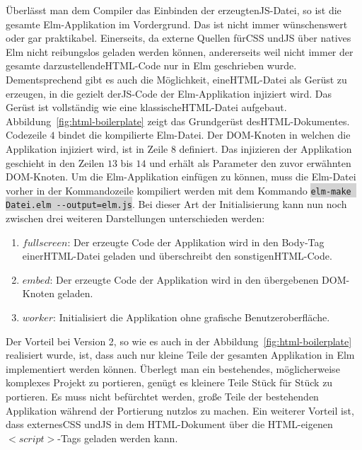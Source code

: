 Überlässt man dem Compiler das Einbinden der erzeugten\ac{JS}-Datei, so ist die gesamte Elm-Applikation im Vordergrund. Das ist nicht immer wünschenswert oder gar praktikabel. Einerseits, da externe Quellen für\ac{CSS} und\ac{JS} über natives Elm nicht reibungslos geladen werden können, andererseits weil nicht immer der gesamte darzustellende\ac{HTML}-Code nur in Elm geschrieben wurde. Dementsprechend gibt es auch die Möglichkeit, eine\ac{HTML}-Datei als Gerüst zu erzeugen, in die gezielt der\ac{JS}-Code der Elm-Applikation injiziert wird. Das Gerüst ist vollständig wie eine klassische\ac{HTML}-Datei aufgebaut. Abbildung~\ref{fig:html-boilerplate} zeigt das Grundgerüst des\ac{HTML}-Dokumentes. Codezeile $4$ bindet die kompilierte Elm-Datei. Der \ac{DOM}-Knoten in welchen die Applikation injiziert wird, ist in Zeile $8$ definiert. Das injizieren der Applikation geschieht in den Zeilen $13$ bis $14$ und erhält als Parameter den zuvor erwähnten \ac{DOM}-Knoten. Um die Elm-Applikation einfügen zu können, muss die Elm-Datei vorher in der Kommandozeile kompiliert werden mit dem Kommando \colorbox{lightgray}{\lstinline{elm-make Datei.elm --output=elm.js}}.
Bei dieser Art der Initialisierung kann nun noch zwischen drei weiteren Darstellungen unterschieden werden:
\begin{enumerate}
\item$fullscreen$: Der erzeugte Code der Applikation wird in den Body-Tag einer\ac{HTML}-Datei geladen und überschreibt den sonstigen\ac{HTML}-Code.

\item$embed$: Der erzeugte Code der Applikation wird in den übergebenen DOM-Knoten geladen.

\item$worker$: Initialisiert die Applikation ohne grafische Benutzeroberfläche.
\end{enumerate}
Der Vorteil bei Version 2, so wie es auch in der Abbildung~\ref{fig:html-boilerplate} realisiert wurde, ist, dass auch nur kleine Teile der gesamten Applikation in Elm implementiert werden können. Überlegt man ein bestehendes, möglicherweise komplexes Projekt zu portieren, genügt es kleinere Teile Stück für Stück zu portieren. Es muss nicht befürchtet werden, große Teile der bestehenden Applikation während der Portierung nutzlos zu machen. Ein weiterer Vorteil ist, dass externes\ac{CSS} und\ac{JS} in dem \ac{HTML}-Dokument über die \ac{HTML}-eigenen $<script>$-Tags geladen werden kann.
